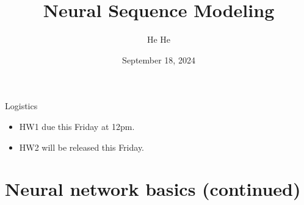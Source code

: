 \documentclass[usenames,dvipsnames,notes,11pt,aspectratio=169,hyperref={colorlinks=true, linkcolor=blue}]{beamer}
\title[DS-GA.1011]{Neural Sequence Modeling}
\author[He He]{He He
}
\institute[NYU]{
    \texttt{[image: ../figures/nyu-logo]}\\
}
\date{September 18, 2024}
\begin{document}
\begin{frame}
\titlepage
\end{frame}


\begin{frame}
    {Logistics}
    \begin{itemize}
        \item HW1 due this Friday at 12pm.
        \item HW2 will be released this Friday.
    \end{itemize}
\end{frame}

\section{Neural network basics (continued)}
\end{document}
